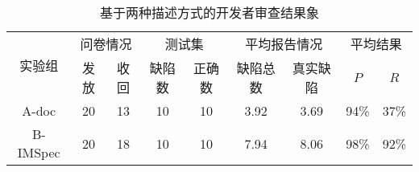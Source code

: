 \begin{table}[b]
	\centering
	\begin{minipage}[t]{0.95\linewidth} %
		\caption{基于两种描述方式的开发者审查结果象}
		\label{tab:2-5-survey}
			\begin{tabular}{ccccccccc}
			\hline
			\multirow{2}{*}{实验组} & \multicolumn{2}{c}{问卷情况} & \multicolumn{2}{c}{测试集} & \multicolumn{2}{c}{平均报告情况} & \multicolumn{2}{c}{平均结果} \\
			\cline{2-9}
			& 发放 & 收回 & 缺陷数& 正确数& 缺陷总数 & 真实缺陷 & $P$ & $R$ \\
			\hline
		A-doc	& 20 & 13 & 10& 10& 3.92 & 3.69 & 94\% & 37\% \\
		 B-IMSpec	& 20 & 18 & 10& 10& 7.94 & 8.06 & 98\% & 92\% \\
			\hline
		\end{tabular}
	\end{minipage}
\end{table}